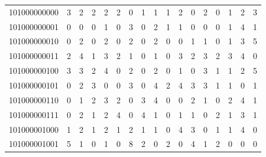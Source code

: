 \documentclass[10pt,a4paper]{article}
\begin{document}
\begin{longtable}{ |c|c|c|c|c|c|c|c|c|c|c|c|c|c|c|c|c| }
    101000000000              & 3                            & 2                                & 2                            & 2                              & 2   & 0   & 1   & 1   & 1   & 2   & 0   & 2   & 0   & 1   & 2   & 3   \\
    101000000001              & 0                            & 0                                & 0                            & 1                              & 0   & 3   & 0   & 2   & 1   & 1   & 0   & 0   & 0   & 1   & 4   & 1   \\
    101000000010              & 0                            & 2                                & 0                            & 2                              & 0   & 2   & 0   & 2   & 0   & 0   & 1   & 1   & 0   & 1   & 3   & 5   \\
    101000000011              & 2                            & 4                                & 1                            & 3                              & 2   & 1   & 0   & 1   & 0   & 3   & 2   & 3   & 2   & 3   & 4   & 0   \\
    101000000100              & 3                            & 3                                & 2                            & 4                              & 0   & 2   & 0   & 2   & 0   & 1   & 0   & 3   & 1   & 1   & 2   & 5   \\
    101000000101              & 0                            & 2                                & 3                            & 0                              & 0   & 3   & 0   & 4   & 2   & 4   & 3   & 3   & 1   & 1   & 0   & 1   \\
    101000000110              & 0                            & 1                                & 2                            & 3                              & 2   & 0   & 3   & 4   & 0   & 0   & 2   & 1   & 0   & 2   & 4   & 1   \\
    101000000111              & 0                            & 2                                & 1                            & 2                              & 4   & 0   & 4   & 1   & 0   & 1   & 1   & 0   & 2   & 1   & 3   & 1   \\
    101000001000              & 1                            & 2                                & 1                            & 2                              & 1   & 2   & 1   & 1   & 0   & 4   & 3   & 0   & 1   & 1   & 4   & 0   \\
    101000001001              & 5                            & 1                                & 0                            & 1                              & 0   & 8   & 2   & 0   & 2   & 0   & 4   & 1   & 2   & 0   & 0   & 0   \\

\end{longtable}
\end{document}
